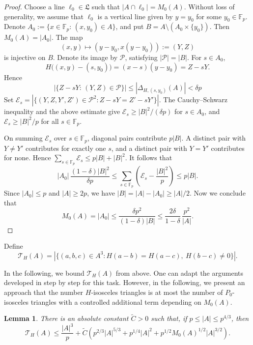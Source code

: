 \documentclass[11pt]{article}
\newtheorem{lemma}[theorem]{Lemma}
\newcommand{\F}{\mathbb F}
\begin{document}
\begin{proof}
Choose a line $\ell_0\in \mathfrak L$ such that $|A\cap \ell_0|=M_0(A)$. Without loss of generality, we assume that $\ell_0$ is a vertical line given by $y=y_0$ for some $y_0\in \F_p$. Denote $A_0:=\{x\in \F_p:\, (x,y_0)\in A\}$, and put $B=A\setminus(A_0\times\{y_0\})$. Then $M_0(A)=|A_0|$. The map
\[
 (x,y)\longmapsto (y-y_0,x(y-y_0)):=(Y,Z)
\]
is injective on $B$. Denote its image by $\mathcal P$, satisfying $|\mathcal P|=|B|$. For $s\in A_0$,
\[
 H\bigl((x,y)-(s,y_0)\bigr)=(x-s)(y-y_0)=Z-sY.
\]
Hence
\[
|\{Z-sY:\, (Y,Z)\in \mathcal P\}|\leq |\Delta_{H,(s,y_0)}(A)|<\delta p
\]
Set $\mathcal E_s=|\{(Y,Z,Y',Z')\in\mathcal P^2:Z-sY=Z'-sY'\}|$. The Cauchy--Schwarz inequality and the above estimate give
$\mathcal E_s\ge |B|^2/(\delta p)$ for $s\in A_0$, and $\mathcal E_s\ge |B|^2/p$ for all $s\in \F_p$.

On summing $\mathcal E_s$ over $s\in\F_p$, diagonal pairs contribute $p|B|$. A distinct pair with $Y\ne Y'$ contributes for exactly one $s$,
and a distinct pair with $Y=Y'$ contributes for none.  Hence $\sum_{s\in\F_p}\mathcal E_s\le p|B|+|B|^2$. It follows that
\[
|A_0|\,\frac{(1-\delta)|B|^2}{\delta p} \leq \sum_{s\in\F_p}\left(\mathcal E_s-\frac{|B|^2}{p}\right)\le p|B|.
\]
Since $|A_0|\le p$ and $|A|\ge2p$, we have $|B|=|A|-|A_0|\ge |A|/2$. Now we conclude that 
\[
M_0(A)=|A_0| \leq \frac{\delta p^2}{(1-\delta)|B|} \leq \frac{2\delta}{1-\delta}\,\frac{p^2}{|A|}.
\]
\end{proof}

Define
\begin{equation}
 \label{eq:TH-def}
 \mathcal T_H(A)
 =
 |\{(a,b,c)\in A^3:
      H(a-b)=H(a-c),\ H(b-c)\ne0\}|.
\end{equation}

In the following, we bound $\mathcal T_H(A)$ from above. One can adapt the arguments developed in \cite{MPPRS} step by step for this task. However, in the following, we present an approach that the number $H$-isosceles triangles is at most the number of $P_0$-isosceles triangles with a controlled additional term depending on $M_0(A)$.


\begin{lemma}
\label{lem:split-isosceles}
There is an absolute constant $\widetilde{C}>0$ such that, if
$p\le |A|\le p^{4/3}$, then
\begin{equation}\label{eq:split-isosceles}
\mathcal T_H(A) \le \frac{|A|^3}{p}+\widetilde{C}\left(p^{2/3}|A|^{5/3}+p^{1/4}|A|^2 + p^{1/2}M_0(A)^{1/2}|A|^{3/2}\right).
\end{equation}
\end{lemma}
\end{document}
